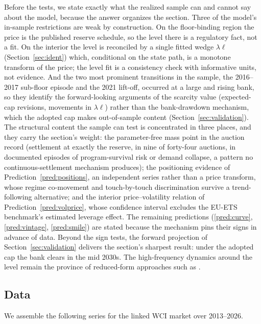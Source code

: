 \documentclass[11pt,letterpaper]{article}
\theoremstyle{plain}
\theoremstyle{definition}
\numberwithin{equation}{section}
\begin{document}
Before the tests, we state exactly what the realized sample can and cannot say about the model, because the answer organizes the section. Three of the model's in-sample restrictions are weak by construction. On the floor-binding region the price is the published reserve schedule, so the level there is a regulatory fact, not a fit. On the interior the level is reconciled by a single fitted wedge $\lambda\ell$ (Section~\ref{sec:ident}) which, conditional on the state path, is a monotone transform of the price; the level fit is a consistency check with informative units, not evidence. And the two most prominent transitions in the sample, the 2016--2017 sub-floor episode and the 2021 lift-off, occurred at a large and rising bank, so they identify the forward-looking arguments of the scarcity value (expected-cap revisions, movements in $\lambda\ell$) rather than the bank-drawdown mechanism, which the adopted cap makes out-of-sample content (Section~\ref{sec:validation}). The structural content the sample can test is concentrated in three places, and they carry the section's weight: the parameter-free mass point in the auction record (settlement at exactly the reserve, in nine of forty-four auctions, in documented episodes of program-survival risk or demand collapse, a pattern no continuous-settlement mechanism produces); the positioning evidence of Prediction~\ref{pred:positions}, an independent series rather than a price transform, whose regime co-movement and touch-by-touch discrimination survive a trend-following alternative; and the interior price--volatility relation of
Prediction~\ref{pred:volprice}, whose confidence interval excludes the EU-ETS benchmark's estimated leverage effect. The remaining predictions (\ref{pred:curve}, \ref{pred:vintage}, \ref{pred:smile}) are stated because the mechanism pins their signs in advance of data. Beyond the sign tests, the forward projection of Section~\ref{sec:validation} delivers the section's sharpest result: under the adopted cap the bank clears in the mid 2030s. The high-frequency dynamics around the level remain the province of reduced-form approaches such as \citet{fang2019}.

\subsection{Data}\label{sec:data}
 
We assemble the following series for the linked WCI market over 2013--2026.
 
\end{document}
